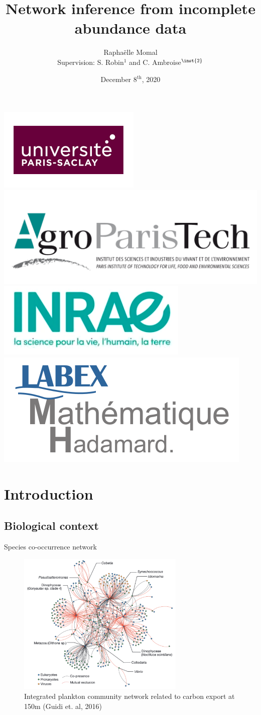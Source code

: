 \documentclass[11pt]{beamer}
\title{Network inference from incomplete abundance data}
\author{Raphaëlle Momal\\
\tiny{Supervision:  S. Robin$^{{1}}$ and C. Ambroise$^{\inst{2}}$  }}
\institute[]
{
  \inst{1}%
  UMR AgroParisTech / INRA MIA-Paris \\
  \inst{2}%
  LaMME, Evry
  }
\date{December 8$^{\text{th}}$, 2020}
\begin{document}
\begin{frame}
    \titlepage
    \begin{center}
    \includegraphics[width=0.15\linewidth]{images/UPsaclay.png}
    \includegraphics[width=0.2\linewidth]{images/agro.PNG}\hspace{0.1cm}
	\includegraphics[width=0.15\linewidth]{images/inrae.png}\hspace{0.15cm}
	\includegraphics[width=0.17\linewidth]{images/lmh.png}\hspace{0.15cm}
\end{center}
\end{frame}



\section{Introduction}
\subsection{Biological context}
\begin{frame}{Species co-occurrence network}
\vspace{-0.5cm}
 \begin{figure}
 \centering
 \includegraphics[width=8cm]{images/plancton.png}
\caption{\footnotesize{Integrated plankton community network related to carbon export at 150m (Guidi et. al, 2016)}}

 \end{figure}
 
\end{frame}
 
\end{document}
